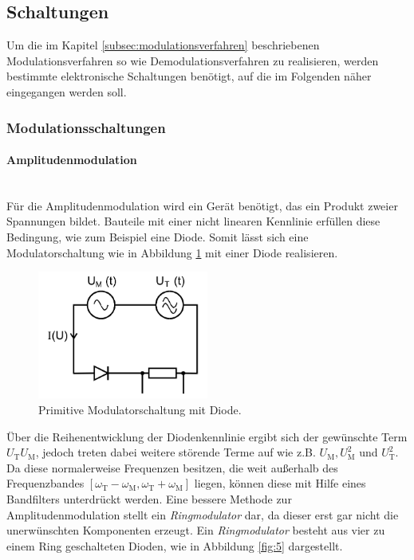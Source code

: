 \FloatBarrier

\subsection{Schaltungen}
\label{subsec:schaltungen}
Um die im Kapitel \ref{subsec:modulationsverfahren}
beschriebenen Modulationsverfahren so wie Demodulationsverfahren zu realisieren, werden
bestimmte elektronische Schaltungen
benötigt, auf die im Folgenden näher eingegangen werden soll.

\subsubsection{Modulationsschaltungen}
\label{subsubsec:modulationsschaltungen}
\paragraph{Amplitudenmodulation}
\mbox{}\\
Für die Amplitudenmodulation
wird ein Gerät benötigt, das ein
Produkt zweier Spannungen bildet.
Bauteile mit einer nicht linearen Kennlinie
erfüllen diese Bedingung, wie zum Beispiel eine
Diode.
Somit lässt sich eine Modulatorschaltung
wie in Abbildung \ref{fig:diode}
mit einer Diode realisieren.
\begin{figure}
\centering
\includegraphics[width=0.5\textwidth]{figures/diode.PNG}
\caption{Primitive Modulatorschaltung mit Diode.\cite{sample}}
\label{fig:diode}
\end{figure}
Über die Reihenentwicklung der
Diodenkennlinie ergibt sich der gewünschte
Term $U_{\text{T}}U_{\text{M}}$, jedoch
treten dabei weitere störende Terme
auf wie z.B. $U_{\text{M}}, U_{\text{M}}^2$ und $U_{\text{T}}^2$.
Da diese normalerweise Frequenzen
besitzen, die weit außerhalb des
Frequenzbandes $[\omega_{\text{T}}-\omega_{\text{M}},\omega_{\text{T}}+\omega_{\text{M}}]$ liegen,
können diese mit Hilfe eines Bandfilters unterdrückt werden.
Eine bessere Methode zur Amplitudenmodulation
stellt ein
\textit{Ringmodulator} dar, da dieser
erst gar nicht die unerwünschten Komponenten
erzeugt.
Ein \textit{Ringmodulator} besteht aus
vier zu einem Ring geschalteten Dioden,
wie in Abbildung
\ref{fig:5} dargestellt.

